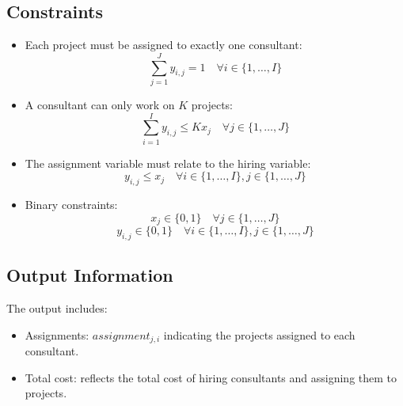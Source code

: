 \documentclass{article}
\begin{document}
\subsection*{Constraints}
\begin{itemize}
    \item Each project must be assigned to exactly one consultant:
    \[
    \sum_{j=1}^{J} y_{i,j} = 1 \quad \forall i \in \{1, \ldots, I\}
    \]
    
    \item A consultant can only work on $K$ projects:
    \[
    \sum_{i=1}^{I} y_{i,j} \leq K x_{j} \quad \forall j \in \{1, \ldots, J\}
    \]
    
    \item The assignment variable must relate to the hiring variable:
    \[
    y_{i,j} \leq x_{j} \quad \forall i \in \{1, \ldots, I\}, j \in \{1, \ldots, J\}
    \]
    
    \item Binary constraints:
    \[
    x_{j} \in \{0, 1\} \quad \forall j \in \{1, \ldots, J\}
    \]
    \[
    y_{i,j} \in \{0, 1\} \quad \forall i \in \{1, \ldots, I\}, j \in \{1, \ldots, J\}
    \]
\end{itemize}

\subsection*{Output Information}
The output includes:
\begin{itemize}
    \item Assignments: $assignment_{j,i}$ indicating the projects assigned to each consultant.
    \item Total cost: reflects the total cost of hiring consultants and assigning them to projects.
\end{itemize}
\end{document}
